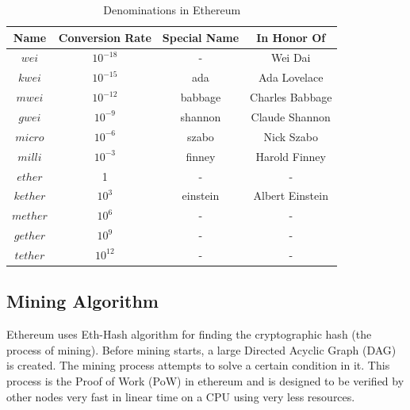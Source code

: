 \documentclass[11pt,openright]{report}
\begin{document}
\begin{table}[!htbp]
	\renewcommand{\arraystretch}{1.3}
	\caption{Denominations in Ethereum}
	\label{eth_denominations}
	\centering
	\begin{tabular}{|c||c|c|c|}
		\hline
		\bfseries Name & \bfseries Conversion Rate & \bfseries Special Name & \bfseries In Honor Of\\
		\hline\hline
		$wei$ & $10^{-18}$ & - & Wei Dai \\ \hline
	    $kwei$ & $10^{-15}$ & ada & Ada Lovelace \\ \hline
	    $mwei$ & $10^{-12}$ & babbage & Charles Babbage \\ \hline
	    $gwei$ & $10^{-9}$ & shannon & Claude Shannon \\ \hline
	    $micro$ & $10^{-6}$ & szabo & Nick Szabo \\ \hline
	    $milli$ & $10^{-3}$ & finney & Harold Finney \\ \hline
	    $ether$ & 1 & - & - \\ \hline
	    $kether$ & $10^{3}$ & einstein & Albert Einstein \\ \hline
	    $mether$ & $10^{6}$ & - & - \\ \hline
	    $gether$ & $10^{9}$ & - & - \\ \hline
	    $tether$ & $10^{12}$ & - & - \\ \hline
	\end{tabular}
\end{table}

\subsection{Mining Algorithm}
Ethereum uses Eth-Hash algorithm \cite{wood2014yellow} for finding the cryptographic hash (the process of mining). Before mining starts, a large Directed Acyclic Graph (DAG) is created. The mining process attempts to solve a certain condition in it. This process is the Proof of Work (PoW) in ethereum and is designed to be verified by other nodes very fast in linear time on a CPU using very less resources.
\end{document}
